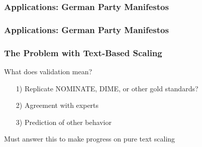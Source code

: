 \documentclass{beamer}
\begin{document}
\begin{frame}
\frametitle<1>{Applications: German Party Manifestos}
\frametitle<2>{Applications: German Party Manifestos}




\end{frame}


\begin{frame}
\frametitle{The Problem with Text-Based Scaling}

What does validation mean?
\begin{itemize}
\item[1)] Replicate NOMINATE, DIME, or other gold standards?
\item[2)] Agreement with experts
\item[3)] Prediction of other behavior
\end{itemize}

Must answer this to make progress on pure text scaling


\end{frame}
\end{document}
